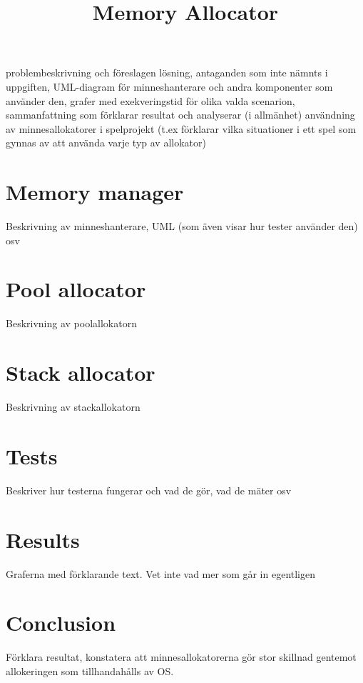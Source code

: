 \documentclass{article}
\title{Memory Allocator}
\begin{document}
\maketitle
\thispagestyle{empty}
\newpage

\tableofcontents
\thispagestyle{empty}
\newpage

\setcounter{page}{1}

problembeskrivning och föreslagen lösning, antaganden som inte nämnts i uppgiften, UML-diagram för minneshanterare och andra komponenter som använder den, grafer med exekveringstid för olika valda scenarion, sammanfattning som förklarar resultat och analyserar (i allmänhet) användning av minnesallokatorer i spelprojekt (t.ex förklarar vilka situationer i ett spel som gynnas av att använda varje typ av allokator)

\section{Memory manager}
Beskrivning av minneshanterare, UML (som även visar hur tester använder den) osv

\section{Pool allocator}
Beskrivning av poolallokatorn

\section{Stack allocator}
Beskrivning av stackallokatorn

\section{Tests}
Beskriver hur testerna fungerar och vad de gör, vad de mäter osv

\section{Results}
Graferna med förklarande text. Vet inte vad mer som går in egentligen

\section{Conclusion}
Förklara resultat, konstatera att minnesallokatorerna gör stor skillnad gentemot allokeringen som tillhandahålls av OS.
\end{document}
